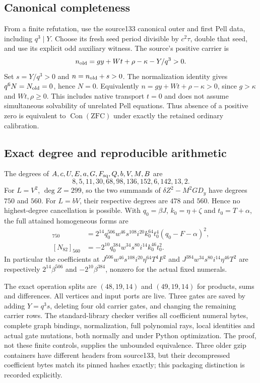 \subsection{Canonical completeness}
From a finite refutation, use the source133 canonical outer and first
Pell data, including $q^3\mid Y$. Choose its fresh seed period divisible
by $c^2\tau$, double that seed, and use its explicit odd auxiliary
witness. The source's positive carrier is
\[
 n_{\rm old}=gy+Wt+\rho-\kappa-Y/q^3>0.
\]
Set $s=Y/q^3>0$ and $n=n_{\rm old}+s>0$.
The normalization identity gives $q^6N=N_{\rm old}=0$, hence $N=0$.
Equivalently $n=gy+Wt+\rho-\kappa>0$, since $g>\kappa$ and
$Wt,\rho\ge0$. This includes native transport $t=0$ and does not
assume simultaneous solvability of unrelated Pell equations.
Thus absence of a positive zero is equivalent to $\operatorname{Con}
(\mathrm{ZFC})$ under exactly the retained ordinary calibration.

\subsection{Exact degree and reproducible arithmetic}
The degrees of $A,c,U,E,a,G,F_{\rm sq},Q,b,V,M,B$ are
\[
 8,5,11,30,68,98,136,152,6,142,13,2.
\]
For $L=V^2$, $\deg Z=299$, so the two summands of
$\delta Z^2-M^2GD_y$ have degrees $750$ and $560$. For $L=bV$, their
respective degrees are $478$ and $560$. Hence no highest-degree cancellation
is possible.
With $q_0=\beta J$, $k_0=\eta+\zeta$ and $t_0=T+\alpha$, the full
attained homogeneous forms are
\begin{align*}
 [N_{81}]_{750}&=2^{14}q_0^{506}w^{46}s^{108}i^{20}k_0^{64}
 t_0^4(q_0-F-\alpha)^2,\\
 [N_{82}]_{560}&=-2^{10}q_0^{384}w^{34}s^{80}i^{14}k_0^{46}t_0^2.
\end{align*}
In particular the coefficients at
$J^{506}w^{46}s^{108}i^{20}\eta^{64}T^4F^2$ and
$J^{384}w^{34}s^{80}i^{14}\eta^{46}T^2$ are respectively
$2^{14}\beta^{506}$ and $-2^{10}\beta^{384}$, nonzero for the actual
fixed numerals.

The exact operation splits are $(48,19,14)$ and $(49,19,14)$ for products,
sums and differences. All vertices and input ports are live. Three gates
are saved by adding $Y=q^3s$, deleting four old carrier gates, and changing
the remaining carrier rows. The standard-library checker verifies all
coefficient numeral bytes, complete graph bindings, normalization,
full polynomial rays, local identities and actual gate mutations, both
normally and under Python optimization. The proof, not these finite
controls, supplies the unbounded equivalence. Three older gzip containers
have different headers from source133, but their decompressed coefficient
bytes match its pinned hashes exactly; this packaging distinction is
recorded explicitly.
